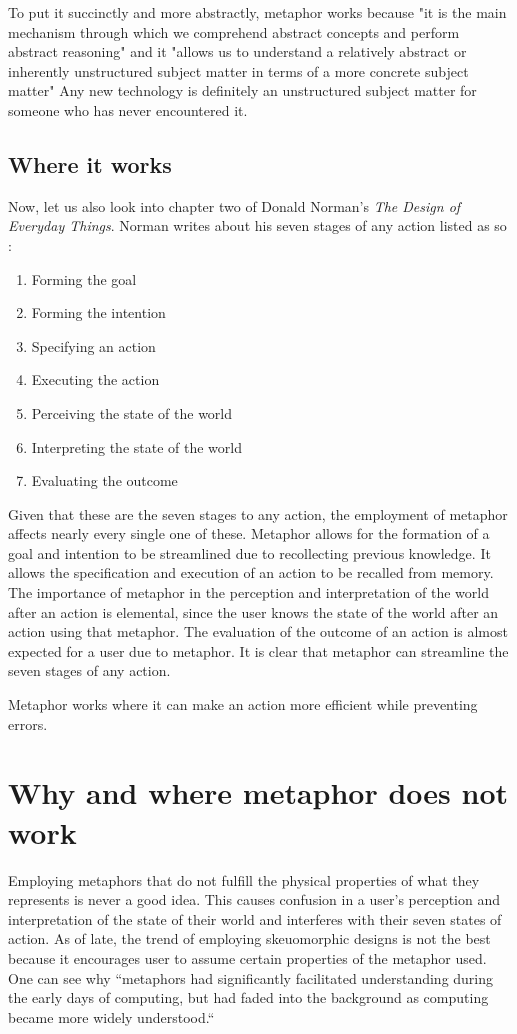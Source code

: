 \documentclass[11pt, oneside]{article}
\begin{document}
To put it succinctly and more abstractly, metaphor works because "it is the main mechanism through which we comprehend abstract concepts and perform abstract reasoning" and it "allows us to understand a relatively abstract or inherently unstructured subject matter in terms of a more concrete subject matter" \cite{metaphor-theory-practice} Any new technology is definitely an unstructured subject matter for someone who has never encountered it.

\subsection{Where it works}
Now, let us also look into chapter two of Donald Norman's \textit{The Design of Everyday Things}. Norman writes about his seven stages of any action listed as so \cite{norman-seven-stages}:
\begin{enumerate}
\item Forming the goal
\item Forming the intention
\item Specifying an action
\item Executing the action
\item Perceiving the state of the world
\item Interpreting the state of the world
\item Evaluating the outcome
\end{enumerate}

Given that these are the seven stages to any action, the employment of metaphor affects nearly every single one of these. Metaphor allows for the formation of a goal and intention to be streamlined due to recollecting previous knowledge. It allows the specification and execution of an action to be recalled from memory. The importance of metaphor in the perception and interpretation of the world after an action is elemental, since the user knows the state of the world after an action using that metaphor. The evaluation of the outcome of an action is almost expected for a user due to metaphor. It is clear that metaphor can streamline the seven stages of any action.

Metaphor works where it can make an action more efficient while preventing errors.

\section{Why and where metaphor does not work}
Employing metaphors that do not fulfill the physical properties of what they represents is never a good idea. This causes confusion in a user's perception and interpretation of the state of their world and interferes with their seven states of action. As of late, the trend of employing skeuomorphic designs is not the best because it encourages user to assume certain properties of the metaphor used. One can see why ``metaphors had significantly facilitated understanding during the early days of computing, but had faded into the background as computing became more widely understood.`` \cite{metaphor-theory-practice}
\end{document}
